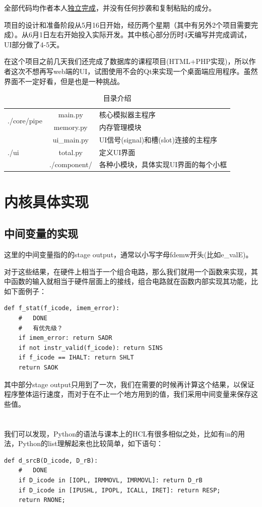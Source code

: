 \documentclass{article}
\begin{document}
全部代码均作者本人\underline{独立完成}，并没有任何抄袭和复制粘贴的成分。

项目的设计和准备阶段从5月16日开始，经历两个星期（其中有另外2个项目需要完成）。从6月1日左右开始投入实际开发。其中核心部分历时4天编写并完成调试，UI部分做了4-5天。

在这个项目之前几天我们还完成了数据库的课程项目(HTML+PHP实现)，所以作者这次不想再写web端的UI，试图使用不会的Qt来实现一个桌面端应用程序。虽然界面不一定好看，但是也是一种挑战。


\begin{center}
\begin{table}[!ht]     %
\centering
\caption{目录介绍}
\begin{tabular}{|l|c|l|}
\hline
\multirow{2}{*}{./core/pipe} & main.py & 核心模拟器主程序\\
\cline{2-3}
& memory.py & 内存管理模块\\
\hline
\multirow{3}{*}{./ui} & ui\_main.py & UI信号(signal)和槽(slot)连接的主程序\\
\cline{2-3}
& total.py & 定义UI界面\\
\cline{2-3}
& ./component/ & 各种小模块，具体实现UI界面的每个小框\\
\hline
\end{tabular}
\end{table}
\end{center}

\section{内核具体实现}
\subsection{中间变量的实现}
这里的中间变量指的的stage output，通常以小写字母fdemw开头(比如e\_valE)。

对于这些结果，在硬件上相当于一个组合电路，那么我们就用一个函数来实现，其中函数的输入就相当于硬件层面上的接线，组合电路就在函数内部实现其功能，比如下面例子：

\begin{lstlisting}[frame=single]
def f_stat(f_icode, imem_error):
    #   DONE
    #   有优先级？
    if imem_error: return SADR
    if not instr_valid(f_icode): return SINS
    if f_icode == IHALT: return SHLT
    return SAOK

\end{lstlisting}

其中部分stage output只用到了一次，我们在需要的时候再计算这个结果，以保证程序整体运行速度，而对于在不止一个地方用到的值，我们采用中间变量来保存这些值。
\\
\\
\\
\indent 我们可以发现，Python的语法与课本上的HCL有很多相似之处，比如有in的用法，Python的list理解起来也比较简单，如下语句：
\begin{lstlisting}[frame=single]
def d_srcB(D_icode, D_rB):
    #   DONE
    if D_icode in [IOPL, IRMMOVL, IMRMOVL]: return D_rB
    if D_icode in [IPUSHL, IPOPL, ICALL, IRET]: return RESP;
    return RNONE;
\end{lstlisting}
\end{document}
